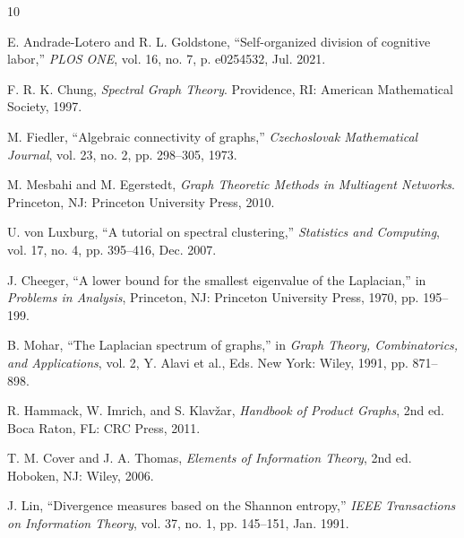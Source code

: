 \documentclass[conference]{IEEEtran}
\begin{document}

\begin{thebibliography}{10}

E. Andrade-Lotero and R. L. Goldstone, ``Self-organized division of cognitive labor,'' \textit{PLOS ONE}, vol. 16, no. 7, p. e0254532, Jul. 2021.

F. R. K. Chung, \textit{Spectral Graph Theory}. Providence, RI: American Mathematical Society, 1997.

M. Fiedler, ``Algebraic connectivity of graphs,'' \textit{Czechoslovak Mathematical Journal}, vol. 23, no. 2, pp. 298--305, 1973.

M. Mesbahi and M. Egerstedt, \textit{Graph Theoretic Methods in Multiagent Networks}. Princeton, NJ: Princeton University Press, 2010.

U. von Luxburg, ``A tutorial on spectral clustering,'' \textit{Statistics and Computing}, vol. 17, no. 4, pp. 395--416, Dec. 2007.

J. Cheeger, ``A lower bound for the smallest eigenvalue of the Laplacian,'' in \textit{Problems in Analysis}, Princeton, NJ: Princeton University Press, 1970, pp. 195--199.

B. Mohar, ``The Laplacian spectrum of graphs,'' in \textit{Graph Theory, Combinatorics, and Applications}, vol. 2, Y. Alavi et al., Eds. New York: Wiley, 1991, pp. 871--898.

R. Hammack, W. Imrich, and S. Klav\v{z}ar, \textit{Handbook of Product Graphs}, 2nd ed. Boca Raton, FL: CRC Press, 2011.

T. M. Cover and J. A. Thomas, \textit{Elements of Information Theory}, 2nd ed. Hoboken, NJ: Wiley, 2006.

J. Lin, ``Divergence measures based on the Shannon entropy,'' \textit{IEEE Transactions on Information Theory}, vol. 37, no. 1, pp. 145--151, Jan. 1991.

\end{thebibliography}
\end{document}
